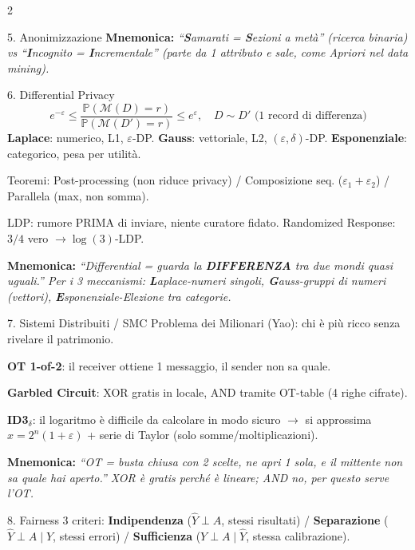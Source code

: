 \documentclass[a4paper,10pt]{article}
\newcommand{\mnem}[1]{{\color{orange!70!black}\textbf{Mnemonica:} \textit{#1}}}
\begin{document}
\begin{multicols}{2}
\begin{area}{5. Anonimizzazione}
\mnem{``\textbf{S}amarati = \textbf{S}ezioni a met\`{a}'' (ricerca binaria) vs ``\textbf{I}ncognito = \textbf{I}ncrementale'' (parte da 1 attributo e sale, come Apriori nel data mining).}
\end{area}

\begin{area}{6. Differential Privacy}
\[
e^{-\varepsilon} \le \frac{\mathbb{P}(\mathcal{M}(D)=r)}{\mathbb{P}(\mathcal{M}(D')=r)} \le e^{\varepsilon}, \quad D\sim D' \text{ (1 record di differenza)}
\]
\textbf{Laplace}: numerico, L1, $\varepsilon$-DP. \textbf{Gauss}: vettoriale, L2, $(\varepsilon,\delta)$-DP. \textbf{Esponenziale}: categorico, pesa per utilit\`{a}.

Teoremi: Post-processing (non riduce privacy) / Composizione seq. ($\varepsilon_1+\varepsilon_2$) / Parallela (max, non somma).

LDP: rumore PRIMA di inviare, niente curatore fidato. Randomized Response: $3/4$ vero $\to \log(3)$-LDP.

\mnem{``Differential = guarda la \textbf{DIFFERENZA} tra due mondi quasi uguali.'' Per i 3 meccanismi: \textbf{L}aplace-numeri singoli, \textbf{G}auss-gruppi di numeri (vettori), \textbf{E}sponenziale-Elezione tra categorie.}
\end{area}

\begin{area}{7. Sistemi Distribuiti / SMC}
Problema dei Milionari (Yao): chi \`{e} pi\`{u} ricco senza rivelare il patrimonio.

\textbf{OT 1-of-2}: il receiver ottiene 1 messaggio, il sender non sa quale.

\textbf{Garbled Circuit}: XOR gratis in locale, AND tramite OT-table (4 righe cifrate).

\textbf{ID3$_\delta$}: il logaritmo \`{e} difficile da calcolare in modo sicuro $\to$ si approssima $x=2^n(1+\varepsilon)$ + serie di Taylor (solo somme/moltiplicazioni).

\mnem{``OT = busta chiusa con 2 scelte, ne apri 1 sola, e il mittente non sa quale hai aperto.'' XOR \`{e} gratis perch\'{e} \`{e} lineare; AND no, per questo serve l'OT.}
\end{area}

\begin{area}{8. Fairness}
3 criteri: \textbf{Indipendenza} ($\hat{Y}\perp A$, stessi risultati) / \textbf{Separazione} ($\hat{Y}\perp A\mid Y$, stessi errori) / \textbf{Sufficienza} ($Y\perp A\mid\hat{Y}$, stessa calibrazione).


\end{area}
\end{multicols}
\end{document}

